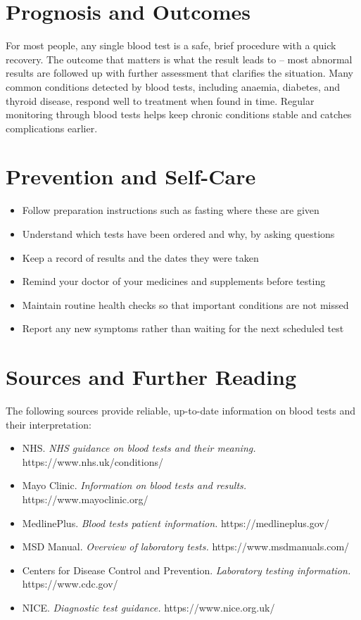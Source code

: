 \section*{Prognosis and Outcomes}
For most people, any single blood test is a safe, brief procedure with a quick recovery. The outcome that matters is what the result leads to -- most abnormal results are followed up with further assessment that clarifies the situation. Many common conditions detected by blood tests, including anaemia, diabetes, and thyroid disease, respond well to treatment when found in time. Regular monitoring through blood tests helps keep chronic conditions stable and catches complications earlier.

\section*{Prevention and Self-Care}
\begin{itemize}
    \item Follow preparation instructions such as fasting where these are given
    \item Understand which tests have been ordered and why, by asking questions
    \item Keep a record of results and the dates they were taken
    \item Remind your doctor of your medicines and supplements before testing
    \item Maintain routine health checks so that important conditions are not missed
    \item Report any new symptoms rather than waiting for the next scheduled test
\end{itemize}

\section*{Sources and Further Reading}
The following sources provide reliable, up-to-date information on blood tests and their interpretation:

\begin{itemize}
    \item NHS. \textit{NHS guidance on blood tests and their meaning.} https://www.nhs.uk/conditions/
    \item Mayo Clinic. \textit{Information on blood tests and results.} https://www.mayoclinic.org/
    \item MedlinePlus. \textit{Blood tests patient information.} https://medlineplus.gov/
    \item MSD Manual. \textit{Overview of laboratory tests.} https://www.msdmanuals.com/
    \item Centers for Disease Control and Prevention. \textit{Laboratory testing information.} https://www.cdc.gov/
    \item NICE. \textit{Diagnostic test guidance.} https://www.nice.org.uk/
\end{itemize}
